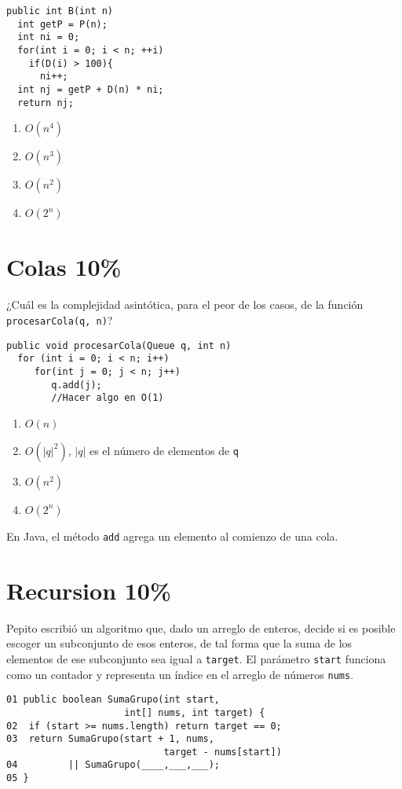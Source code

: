 \documentclass[twocolumn]{article}
\begin{document}
{\small
\begin{verbatim}
public int B(int n)
  int getP = P(n);
  int ni = 0;
  for(int i = 0; i < n; ++i)
    if(D(i) > 100){
      ni++;
  int nj = getP + D(n) * ni;
  return nj;
\end{verbatim}
}

\begin{enumerate}[label=\Alph*]
	\item $O (n^4)$
	\item $O (n^3)$
	\item $O (n^2)$
	\item $O (2^n)$
\end{enumerate} 


\section{Colas 10\%}
¿Cuál es la complejidad asintótica, para el peor de los casos, de la función \texttt{procesarCola(q, n)}?

{\small
\begin{verbatim}
public void procesarCola(Queue q, int n)
  for (int i = 0; i < n; i++)
     for(int j = 0; j < n; j++)
        q.add(j);
        //Hacer algo en O(1)     
\end{verbatim}
}

\begin{enumerate}[label=\Alph*]
	\item $O (n)$
	\item $O (|q|^2)$, $|q|$ es el número de elementos de \texttt{q}
	\item $O (n^2)$
	\item $O (2^n)$\\
\end{enumerate}

En Java, el método \texttt{add} agrega un elemento
 al comienzo de una cola.

\section{Recursion 10\%}
Pepito escribió un algoritmo que, dado un arreglo de enteros, decide si es posible escoger un subconjunto de esos enteros, de tal forma
que la suma de los elementos de ese subconjunto sea igual a \texttt{target}. El parámetro \texttt{start} funciona como un contador y representa un índice en el arreglo de números \texttt{nums}.

{\small
\begin{verbatim}
01 public boolean SumaGrupo(int start, 
                     int[] nums, int target) {
02  if (start >= nums.length) return target == 0;
03  return SumaGrupo(start + 1, nums, 
                            target - nums[start])
04         || SumaGrupo(____,___,___);
05 }
\end{verbatim}
} 
\end{document}
